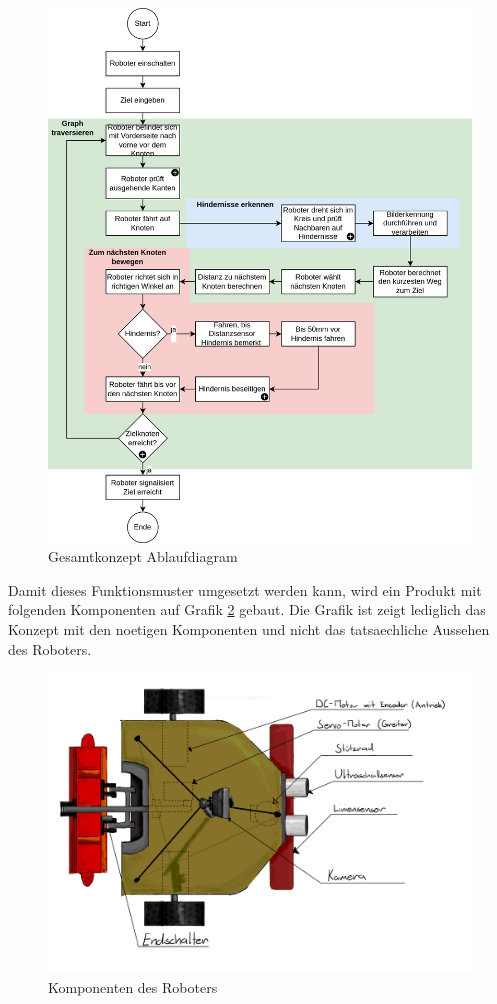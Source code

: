 \begin{figure}[H]
\centering
\includegraphics[width=\textwidth]{assets/gesamtkonzept/ablaufdiagramm.png}
\caption{Gesamtkonzept Ablaufdiagram}
\label{fig:ablauf}
\end{figure}

Damit dieses Funktionsmuster umgesetzt werden kann, wird ein Produkt mit folgenden Komponenten auf Grafik \ref{fig:components} gebaut. Die Grafik ist zeigt lediglich das Konzept mit den noetigen Komponenten und nicht das tatsaechliche Aussehen des Roboters.

\begin{figure}[H]
\centering
\includegraphics[width=\textwidth]{assets/gesamtkonzept/Skizze-Fahrzeugkonzept-Beschriftet.jpg}
\caption{Komponenten des Roboters}
\label{fig:components}
\end{figure}

